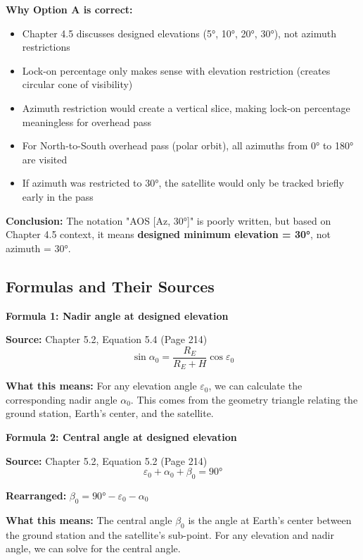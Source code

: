 \documentclass[11pt,letterpaper]{article}
\begin{document}
\textbf{Why Option A is correct:}
\begin{itemize}
    \item Chapter 4.5 discusses designed elevations (5°, 10°, 20°, 30°), not azimuth restrictions
    \item Lock-on percentage only makes sense with elevation restriction (creates circular cone of visibility)
    \item Azimuth restriction would create a vertical slice, making lock-on percentage meaningless for overhead pass
    \item For North-to-South overhead pass (polar orbit), all azimuths from 0° to 180° are visited
    \item If azimuth was restricted to 30°, the satellite would only be tracked briefly early in the pass
\end{itemize}

\textbf{Conclusion:} The notation "AOS [Az, 30°]" is poorly written, but based on Chapter 4.5 context, it means \textbf{designed minimum elevation = 30°}, not azimuth = 30°.

\subsection{Formulas and Their Sources}

\textbf{Formula 1: Nadir angle at designed elevation}

\textbf{Source:} Chapter 5.2, Equation 5.4 (Page 214)
\begin{equation}
\sin \alpha_0 = \frac{R_E}{R_E + H} \cos \varepsilon_0
\end{equation}

\textbf{What this means:} For any elevation angle $\varepsilon_0$, we can calculate the corresponding nadir angle $\alpha_0$. This comes from the geometry triangle relating the ground station, Earth's center, and the satellite.

\vspace{0.3cm}

\textbf{Formula 2: Central angle at designed elevation}

\textbf{Source:} Chapter 5.2, Equation 5.2 (Page 214)
\begin{equation}
\varepsilon_0 + \alpha_0 + \beta_0 = 90°
\end{equation}

\textbf{Rearranged:} $\beta_0 = 90° - \varepsilon_0 - \alpha_0$

\textbf{What this means:} The central angle $\beta_0$ is the angle at Earth's center between the ground station and the satellite's sub-point. For any elevation and nadir angle, we can solve for the central angle.
\end{document}
